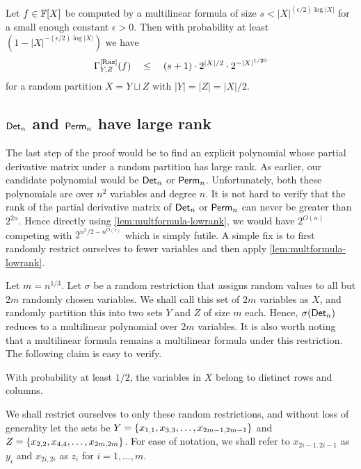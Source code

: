 \begin{lemma}\label{lem:multformula-lowrank}
  Let $f \in \mathbb{F}[X]$ be computed by a multilinear formula of size $s < |X|^{(\epsilon/2) \log |X|}$ for a small enough constant $\epsilon > 0$. 
Then with probability at least $(1 - |X|^{-(\epsilon/2)\log |X|})$ we have $$\Gamma^{\mathrm{[Raz]}}_{Y,Z}(f) \quad \leq \quad (s+1)\cdot 2^{|X|/2} \cdot 2^{-|X|^{1/20}}$$ for a random partition $X = Y \sqcup Z$ with $|Y| = |Z| = |X|/2$.
\end{lemma}

\subsection{$\operatorname{\mathsf{Det}}_n$ and $\operatorname{\mathsf{Perm}}_n$ have large rank}

The last step of the proof would be to find an explicit polynomial whose partial derivative matrix under a random partition has large rank. 
As earlier, our candidate polynomial would be $\operatorname{\mathsf{Det}}_n$ or $\operatorname{\mathsf{Perm}}_n$. 
Unfortunately, both these polynomials are over $n^2$ variables and degree $n$. 
It is not hard to verify that the rank of the partial derivative matrix of $\operatorname{\mathsf{Det}}_n$ or $\operatorname{\mathsf{Perm}}_n$ can never be greater than $2^{2n}$. 
Hence directly using \autoref{lem:multformula-lowrank}, we would have $2^{O(n)}$ competing with $2^{n^2/2 - n^{O(1)}}$ which is simply futile. 
A simple fix is to first randomly restrict ourselves to fewer variables and then apply \autoref{lem:multformula-lowrank}. 

Let $m = n^{1/3}$. 
Let $\sigma$ be a random restriction that assigns random values to all but $2m$ randomly chosen variables. 
We shall call this set of $2m$ variables as $X$, and randomly partition this into two sets $Y$ and $Z$ of size $m$ each. 
Hence, $\sigma(\operatorname{\mathsf{Det}}_n)$ reduces to a multilinear polynomial over $2m$ variables. 
It is also worth noting that a multilinear formula remains a multilinear formula under this restriction. 
The following claim is easy to verify. 

\begin{claim}
With probability at least $1/2$, the variables in $X$ belong to distinct rows and columns. 
\end{claim}

We shall restrict ourselves to only these random restrictions, and without loss of generality let the sets be $Y = \left\{x_{1,1},x_{3,3},\dots,x_{2m-1,2m-1}\right\}$ and $Z = \left\{x_{2,2},x_{4,4},\dots, x_{2m,2m}\right\}$. 
For ease of notation, we shall refer to $x_{2i-1,2i-1}$ as $y_i$ and $x_{2i,2i}$ as $z_i$ for $i = 1,\dots, m$. 

